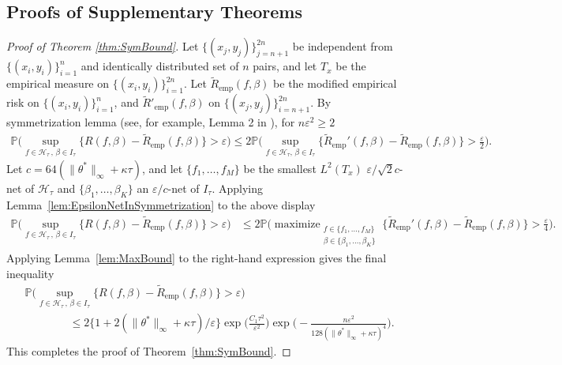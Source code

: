 \documentclass[twoside, onecolumn]{article}
\def\varep{\varepsilon}
\def\Hcal{\mathcal{H}}
\def\Hcal{\mathcal{H}}
\DeclareMathOperator*{\maximize}{maximize}
\begin{document}



\subsection{Proofs of Supplementary Theorems}

\begin{proof}[Proof of Theorem \ref{thm:SymBound}]
Let $\{(x_j, y_j)\}_{j=n+1}^{2n}$ be independent from $\{(x_i, y_i)\}_{i=1}^{n}$ and identically distributed set of $n$ pairs, and let $T_x$ be the empirical measure on $\{(x_i, y_i)\}_{i=1}^{2n}$. Let $\widetilde{R}_{\text{emp}}(f,\beta)$ be the modified empirical risk on $\{(x_i, y_i)\}_{i=1}^{n}$, and $\widetilde{R}'_{\text{emp}}(f,\beta)$ on $\{(x_j, y_j)\}_{i=n+1}^{2n}$. By symmetrization lemma (see, for example, Lemma 2 in \cite{bousquet2004introduction}), for $n\varepsilon^2\geq 2$
\begin{align*}
\mathbb{P}\bigg( \sup_{f\in \mathcal{H}_\tau\,,\, \beta\in I_\tau}  \{R(f,\beta)-\widetilde{R}_\text{emp}(f,\beta)\}>\varepsilon\bigg)\leq 2\mathbb{P}\bigg( \sup_{f\in \mathcal{H}_\tau,\, \beta\in I_\tau}  \{\widetilde{R}_{\text{emp}}'(f,\beta)-\widetilde{R}_\text{emp}(f,\beta)\}>\frac{\varepsilon}{2}\bigg).
\end{align*}
Let $c = 64(\|\theta^*\|_{\infty} + \kappa \tau)$, and let $\{f_1, \dots, f_M\}$ be the smallest $L^2(T_x)$ $\varepsilon/\sqrt{2}c$-net of $\mathcal{H}_\tau$ and $\{\beta_1, \dots, \beta_K\}$ an $\varepsilon/c$-net of $I_\tau$. Applying Lemma~\ref{lem:EpsilonNetInSymmetrization} to the above display
\begin{align*}
\mathbb{P}\bigg( \sup_{f\in \mathcal{H}_\tau\,,\, \beta\in I_\tau}  \{R(f,\beta)-\widetilde{R}_\text{emp}(f,\beta)\}>\varepsilon\bigg)&\leq 2\mathbb{P}\bigg(\maximize_{\substack{f\in \{f_1, \dots, f_M\}\\
\beta\in \{\beta_1, \dots, \beta_K\}}}\{\widetilde{R}_{\text{emp}}'(f,\beta)-\widetilde{R}_\text{emp}(f,\beta)\}>\frac{\varepsilon}{4}\bigg).
\end{align*}
Applying Lemma~\ref{lem:MaxBound} to the right-hand expression gives the final inequality
\begin{align*}
&\mathbb{P}\bigg( \sup_{f\in \mathcal{H}_\tau\,,\, \beta\in I_\tau}  \{R(f,\beta)-\widetilde{R}_\text{emp}(f,\beta)\}>\varepsilon\bigg)\\
&\qquad\qquad\leq 2\{1+2(\|\theta^*\|_\infty+\kappa\tau)/\varep\} 
\exp\Big( \frac{C_1\tau^2}{\varepsilon^2}\Big) \exp\Big(-  \frac{n\varepsilon^2}{128(\|\theta^*\|_\infty+\kappa \tau)^{4}}\Big).
\end{align*}
This completes the proof of Theorem~\ref{thm:SymBound}.
\end{proof}
\end{document}

